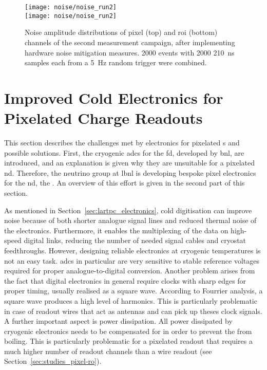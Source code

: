 \begin{figure}[htb]
	\centering
	\texttt{[image: noise/noise\_run2]} \\
	\texttt{[image: noise/noise\_run2]}
	\caption[Noise distributions from second pixel demonstrator measurement campaign]{%
		Noise amplitude distributions of pixel (top) and \acrshort{roi} (bottom) channels of the second measurement campaign, after implementing hardware noise mitigation measures.
		\num{2000} events with \num{2000} \SI{210}{\nano\second} samples each from a \SI{5}{\hertz} random trigger were combined.
	}
	\label{fig:electronics_noise-run2}
\end{figure}


\section{Improved Cold Electronics for Pixelated Charge Readouts}
\label{sec:studies_pixel-electronics}


This section describes the challenges met by electronics for pixelated \lartpc{}s and possible solutions.
First, the cryogenic \glspl{adc} for the \dune{} \gls{fd}, developed by \gls{bnl}, are introduced, and an explanation is given why they are unsuitable for a pixelated \gls{nd}.
Therefore, the neutrino group at \gls{lbnl} is developing bespoke pixel electronics for the \gls{nd}, the \larpix{}.
An overview of this effort is given in the second part of this section.

As mentioned in Section~\ref{sec:lartpc_electronics}, cold digitisation can improve noise because of both shorter analogue signal lines and reduced thermal noise of the electronics.
Furthermore, it enables the multiplexing of the data on high-speed digital links, reducing the number of needed signal cables and cryostat feedthroughs.
However, designing reliable electronics at cryogenic temperatures is not an easy task.
\glspl{adc} in particular are very sensitive to stable reference voltages required for proper analogue-to-digital conversion.
Another problem arises from the fact that digital electronics in general require clocks with sharp edges for proper timing, usually realised as a square wave.
According to Fourrier analysis, a square wave produces a high level of harmonics.
This is particularly problematic in case of readout wires that act as antennas and can pick up theses clock signals.
A further important aspect is power dissipation.
All power dissipated by cryogenic electronics needs to be compensated for in order to prevent the \lar{} from boiling.
This is particularly problematic for a pixelated readout that requires a much higher number of readout channels than a wire readout (see Section~\ref{sec:studies_pixel-ro}).

